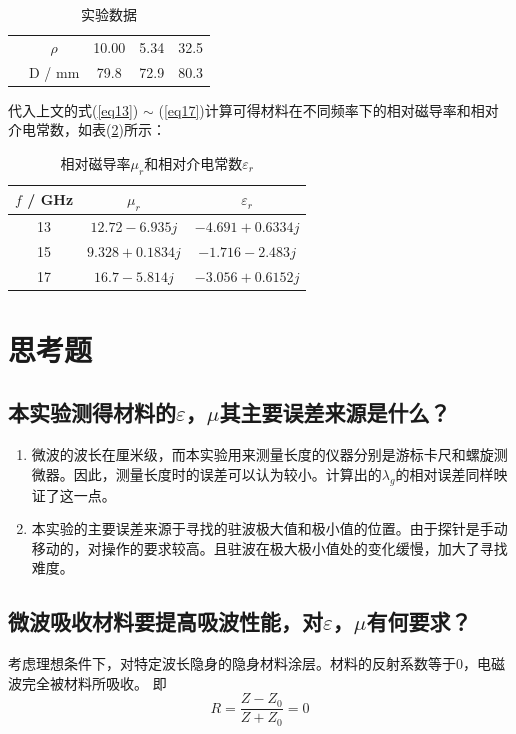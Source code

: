 \documentclass[a4paper]{article}
\begin{document}
\begin{table}[!h]
\begin{tabular}{|c|c|c|c|c|}
		                                                              & \cellcolor[HTML]{EFEFEF}$\rho$ & \cellcolor[HTML]{EFEFEF}10.00 & \cellcolor[HTML]{EFEFEF}5.34  & \cellcolor[HTML]{EFEFEF}32.5 	\\ \cline{2-5}\hhline{~|----|}
		\multirow{-4}{*}{开路}                                        & \cellcolor[HTML]{EFEFEF}D / mm & \cellcolor[HTML]{EFEFEF}79.8  & \cellcolor[HTML]{EFEFEF}72.9  & \cellcolor[HTML]{EFEFEF}80.3	\\ \hline
	\end{tabular}
	\caption{实验数据}\label{table1:data}
\end{table}


代入上文的式(\ref{eq13}) $\sim$ (\ref{eq17})计算可得材料在不同频率下的相对磁导率和相对介电常数，如表(\ref{table2:mu_r and epsilon_r})所示：
\begin{table}[!h]
	\centering
	\begin{tabular}{|c|c|c|}
		\hline
		$f$ / GHz & $\mu_r$             & $\varepsilon_r$     \\ \hline
		13         & $12.72-6.935j$   & $-4.691+0.6334j$ \\ \hline
		15        & $ 9.328+0.1834j$   & $ -1.716-2.483j$  \\ \hline
		17        & $ 16.7-5.814j$ & $ -3.056+0.6152j$   \\ \hline
	\end{tabular}
	\caption{相对磁导率$\mu_r$和相对介电常数$\varepsilon_r$}\label{table2:mu_r and epsilon_r}
\end{table}

\section{思考题}
\subsection{本实验测得材料的$\varepsilon$，$\mu$其主要误差来源是什么？}
\begin{enumerate}
	\item 微波的波长在厘米级，而本实验用来测量长度的仪器分别是游标卡尺和螺旋测微器。因此，测量长度时的误差可以认为较小。计算出的$\lambda_g$的相对误差同样映证了这一点。
	\item 本实验的主要误差来源于寻找的驻波极大值和极小值的位置。由于探针是手动移动的，对操作的要求较高。且驻波在极大极小值处的变化缓慢，加大了寻找难度。
\end{enumerate}
\subsection{微波吸收材料要提高吸波性能，对$\varepsilon$，$\mu$有何要求？}
考虑理想条件下，对特定波长隐身的隐身材料涂层。材料的反射系数等于0，电磁波完全被材料所吸收。
即
\begin{equation}
	R =  \frac{Z - Z_0}{Z + Z_0} = 0
\end{equation}
\end{document}
